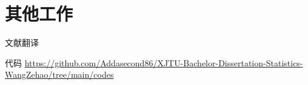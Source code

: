\section{其他工作}
\begin{frame}{文献翻译}
    
\end{frame}

\begin{frame}{代码}
    \url{https://github.com/Addasecond86/XJTU-Bachelor-Dissertation-Statistics-WangZehao/tree/main/codes}
\end{frame}
 